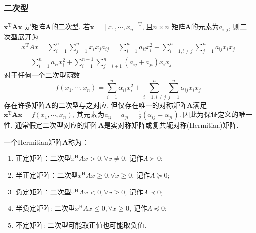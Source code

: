 \documentclass[lang=cn,10pt]{gorgeousnbook}
\numberwithin{equation}{section}%
\numberwithin{figure}{section}%
\begin{document}
\subsubsection{二次型}
$\boldsymbol{x^\mathrm{T}}\boldsymbol{Ax}$ 是矩阵$\bm{A}$的二次型. 若$\boldsymbol{x}=[x_1,\cdots,x_n]^\mathrm{T}$, 且$n \times n$ 矩阵$\bm{A}$的元素为$a_{i,j}$, 则二次型展开为
\begin{equation}
\begin{gathered}
x^{\mathrm{T}}Ax =\sum_{i=1}^n\sum_{j=1}^nx_ix_ja_{ij}=\sum_{i=1}^na_{ii}x_i^2+\sum_{i=1,i\neq j}^n\sum_{j=1}^na_{ij}x_ix_j \\
=\sum_{i=1}^na_{ii}x_i^2+\sum_{i=1}^{n-1}\sum_{j=i+1}^n(a_{ij}+a_{ji})x_ix_j 
\end{gathered}
\end{equation}
对于任何一个二次型函数
\begin{equation}
    f(x_1,\cdots,x_n)=\sum_{i=1}^n\alpha_{ii}x_i^2+\sum_{i=1,i\neq j}^n\sum_{j=1}^n\alpha_{ij}x_ix_j
\end{equation}
存在许多矩阵$\bm{A}$的二次型与之对应, 但仅存在唯一的对称矩阵$\bm{A}$满足$\boldsymbol{x}^\mathrm{T}\boldsymbol{A}\boldsymbol{x}=f(x_1,\cdots,x_n)$, 其元素为$a_{ij}=a_{ji}=\frac{1}{2}(\alpha_{ij}+\alpha_{ji})$. 因此为保证定义的唯一性, 通常假定二次型对应的矩阵$\bm{A}$是实对称矩阵或复共轭对称(Hermitian)矩阵. 
\begin{definition}
    一个Hermitian矩阵$\bm{A}$称为：
    \begin{enumerate}
        \item 正定矩阵：二次型$x^\text{H}Ax>0,\forall x\neq0$, 记作$A\succ 0$;
        \item 半正定矩阵：二次型$x^\text{H}Ax\ge0,\forall x\geqslant 0$, 记作$A\succeq 0$;
        \item 负定矩阵：二次型$x^\text{H}Ax<0,\forall x\geqslant 0$, 记作$A\prec  0$;
        \item 半负定矩阵: 二次型$x^\text{H}Ax\le0,\forall x\geqslant 0$, 记作$A\preceq 0$;
        \item 不定矩阵: 二次型可能取正值也可能取负值. 
    \end{enumerate}
\end{definition}
\end{document}
